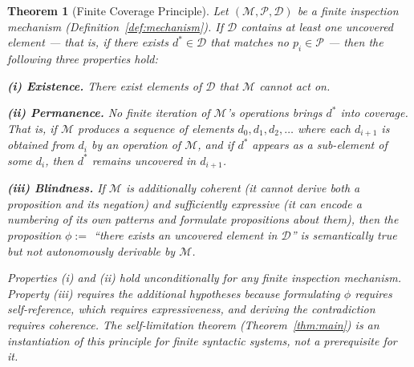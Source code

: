 \documentclass[11pt]{article}
\newtheorem{theorem}{Theorem}[section]
\begin{document}
\begin{theorem}[Finite Coverage Principle]
\label{thm:coverage}
Let $(\mathcal{M}, \mathcal{P}, \mathcal{D})$ be a finite inspection
mechanism (Definition~\ref{def:mechanism}). If $\mathcal{D}$ contains
at least one uncovered element --- that is, if there exists
$d^* \in \mathcal{D}$ that matches no $p_i \in \mathcal{P}$ --- then
the following three properties hold:

\medskip
\noindent\textbf{(i) Existence.} There exist elements of $\mathcal{D}$
that $\mathcal{M}$ cannot act on.

\medskip
\noindent\textbf{(ii) Permanence.} No finite iteration of
$\mathcal{M}$'s operations brings $d^*$ into coverage. That is, if
$\mathcal{M}$ produces a sequence of elements
$d_0, d_1, d_2, \ldots$ where each $d_{i+1}$ is obtained from $d_i$ by
an operation of $\mathcal{M}$, and if $d^*$ appears as a sub-element of
some $d_i$, then $d^*$ remains uncovered in $d_{i+1}$.

\medskip
\noindent\textbf{(iii) Blindness.} If $\mathcal{M}$ is additionally
coherent (it cannot derive both a proposition and its negation) and
sufficiently expressive (it can encode a numbering of its own patterns
and formulate propositions about them), then the proposition
$\phi := $ ``there exists an uncovered element in $\mathcal{D}$'' is
semantically true but not autonomously derivable by $\mathcal{M}$.

Properties (i) and (ii) hold unconditionally for any finite inspection
mechanism. Property (iii) requires the additional hypotheses because
formulating $\phi$ requires self-reference, which requires expressiveness,
and deriving the contradiction requires coherence. The self-limitation
theorem (Theorem~\ref{thm:main}) is an instantiation of this principle
for finite syntactic systems, not a prerequisite for it.
\end{theorem}
\end{document}

